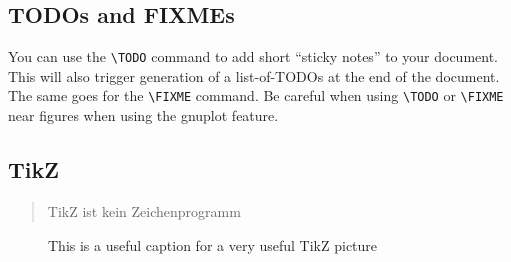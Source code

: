 \subsection{TODOs and FIXMEs}

You can use the \verb|\TODO| command to add short ``sticky notes'' to your document. 
This will also trigger generation of a list-of-TODOs at the end of the document. 
The same goes for the \verb|\FIXME| command.
Be careful when using \verb|\TODO| or \verb|\FIXME| near figures when using the gnuplot feature.

\subsection{TikZ}

\begin{quote}
  TikZ ist kein Zeichenprogramm
\end{quote}

\begin{figure}[h]\centering
{}
\caption{This is a useful caption for a very useful TikZ picture}
\end{figure}
